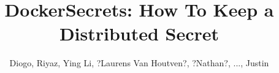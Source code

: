 \documentclass{sig-alternate}
\newcommand{\sysname}{DockerSecrets\xspace}
\begin{document}

\title{\sysname: How To Keep a Distributed Secret}


\newcommand{\showurlx}{[redacted]}

\author{
Diogo, Riyaz, Ying Li, ?Laurens Van Houtven?, ?Nathan?, ..., Justin
}

\maketitle












{\footnotesize 
}
\end{document}

